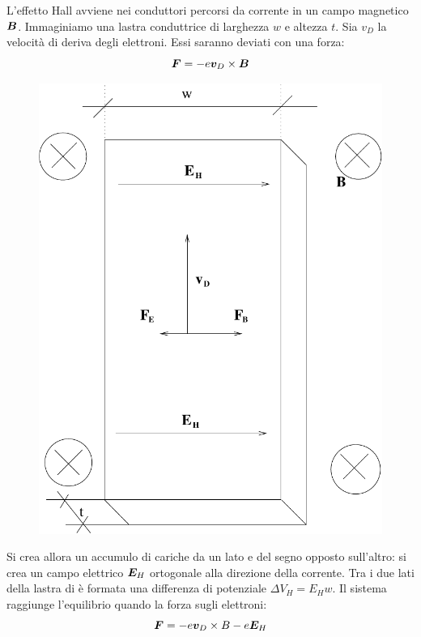 \begin{Es}
L'effetto Hall avviene nei conduttori percorsi da corrente in un campo magnetico $\boldsymbol{B}$. Immaginiamo una lastra conduttrice di larghezza $w$ e altezza $t$. Sia $v_D$ la velocità di deriva degli elettroni. Essi saranno deviati con una forza:
\begin{equation*}\boldsymbol{F}=-e\boldsymbol{v}_D\times \boldsymbol{B}\end{equation*}
\begin{figure}[htbp]
\centering
\includegraphics[scale=0.4]{immagini/fisica2/Hall}
\end{figure}
Si crea allora un accumulo di cariche da un lato e del segno opposto sull'altro: si crea un campo elettrico $\boldsymbol{E}_H$ ortogonale alla direzione della corrente. Tra i due lati della lastra di è formata una differenza di potenziale $\Delta V_H=E_Hw$. Il sistema raggiunge l'equilibrio quando la forza sugli elettroni:
\begin{equation*}\boldsymbol{F}=-e\boldsymbol{v}_D\times B-e\boldsymbol{E}_H\end{equation*}

\end{Es}
